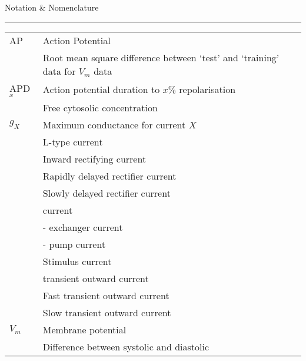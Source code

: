 \documentclass[../thesis-main.tex]{subfiles}
\begin{document}
 \vspace*{10mm}
 {
  \Large\em
  \begin{flushright}
   Notation \& Nomenclature
  \end{flushright}
  \rule{\linewidth}{0.25mm}
 }
 \label{sec:Notation}
 
 \begin{tabular}{p{2.5cm}p{15.5cm}}
  AP		& Action Potential \\
  \aprms	& Root mean square difference between `test' and `training' data for $V_m$ data \\
  APD$_x$	& Action potential duration to $x\%$ repolarisation \\
  \cai		& Free cytosolic \ca{} concentration \\
  $g_X$		& Maximum conductance for current $X$ \\
  \ica		& L-type \ca{} current \\
  \ikix		& Inward rectifying \K{} current \\
  \ikr		& Rapidly delayed rectifier \K{} current \\
  \iks		& Slowly delayed rectifier \K{} current \\
  \ina		& \na{} current \\
  \inaca	& \na{}-\ca{} exchanger current \\
  \inak		& \na{}-\K{} pump current \\
  \istim	& Stimulus current \\
  \ito		& \K{} transient outward current \\
  \itof		& Fast \K{} transient outward current \\
  \itos		& Slow \K{} transient outward current \\
  $V_m$		& Membrane potential \\
  \catrans	& Difference between systolic \cai{} and diastolic \cai{} \\
 \end{tabular}
\end{document}
